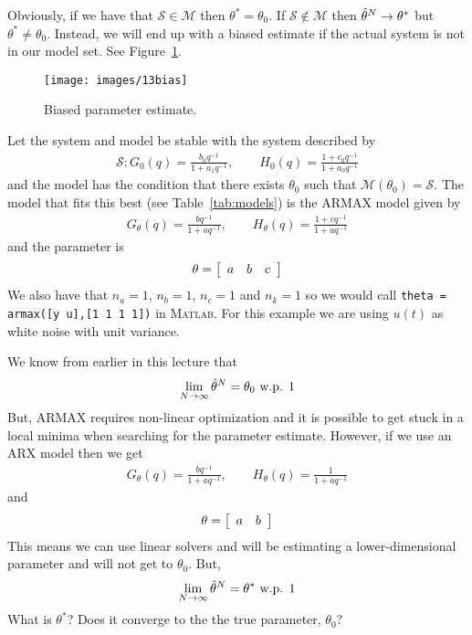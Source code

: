 Obviously, if we have that $\mathcal{S}\in\mathcal{M}$ then $\theta^\ast=\theta_0$.
If $\mathcal{S}\notin\mathcal{M}$ then $\hat{\theta}^N\to\theta^\ast$ but $\theta^\ast\neq\theta_0$.
Instead, we will end up with a biased estimate if the actual system is not in our model set.
See Figure~\ref{fig:13bias}.

\begin{figure}[ht!]
\centering
\texttt{[image: images/13bias]}
\caption{Biased parameter estimate.}
\label{fig:13bias}
\end{figure}

\begin{example}
\label{ex:convergence}
Let the system and model be stable with the system described by
\begin{align*}
\mathcal{S}: G_0(q) = \frac{b_0q^{-1}}{1+a_1q^{-1}}, \qquad H_0(q)=\frac{1+c_0q^{-1}}{1+a_0q^{-1}}
\end{align*}
and the model has the condition that there exists $\theta_0$ such that $\mathcal{M}(\theta_0) = \mathcal{S}$.
The model that fits this best (see Table~\ref{tab:models}) is the ARMAX model given by
\begin{align*}
G_\theta(q) = \frac{bq^{-1}}{1+aq^{-1}}, \qquad H_\theta(q)=\frac{1+cq^{-1}}{1+aq^{-1}}
\end{align*}
and the parameter is
$$\theta=\left[\begin{array}{c c c} a & b & c \end{array}\right]$$
We also have that $n_a=1$, $n_b=1$, $n_c=1$ and $n_k=1$ so we would call \texttt{theta = armax([y u],[1 1 1 1])} in \textsc{Matlab}.
For this example we are using $u (t)$ as white noise with unit variance.

We know from earlier in this lecture that
$$\lim_{N\to\infty}\hat{\theta}^N= \theta_0 \text{ w.p. } 1$$
But, ARMAX requires non-linear optimization and it is possible to get stuck in a local minima when searching for the parameter estimate.
However, if we use an ARX model then we get
\begin{align*}
G_\theta(q) = \frac{bq^{-1}}{1+aq^{-1}}, \qquad H_\theta(q)=\frac{1}{1+aq^{-1}}
\end{align*}
and
$$\theta=\left[\begin{array}{c c} a & b \end{array}\right]$$
This means we can use linear solvers and will be estimating a lower-dimensional parameter and will not get to $\theta_0$.
But,
$$\lim_{N\to\infty}\hat{\theta}^N= \theta^\ast\text{ w.p. } 1$$
What is $\theta^\ast$? Does it converge to the the true parameter, $\theta_0$?


\end{example}
